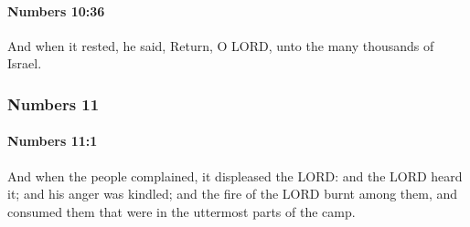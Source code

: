 		\paragraph{Numbers 10:36} %
			\label{NUMBERS-10-36}

			And when it rested, he said, Return, O LORD, unto the many thousands of Israel.

	\subsubsection{Numbers 11} %
		\label{NUMBERS-11}

		\paragraph{Numbers 11:1} %
			\label{NUMBERS-11-1}

			And when the people complained, it displeased the LORD: and the LORD heard it; and his anger was kindled; and the fire of the LORD burnt among them, and consumed them that were in the uttermost parts of the camp.

